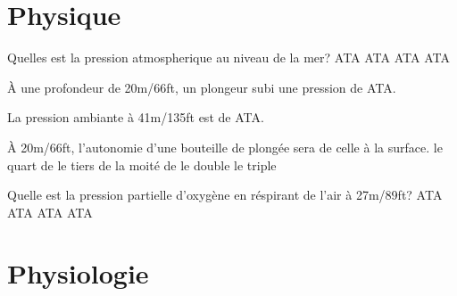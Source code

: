 \documentclass[english,12pt,a4paper]{article}
\begin{document}
\section{Physique}
	\begin{outline}
		\1 Quelles est la pression atmospherique au niveau de la mer?
			 ATA
			 ATA
			 ATA
			 ATA

		\1 À une profondeur de 20m/66ft, un plongeur subi une pression de \underline{\hspace{1.5cm}} ATA.

		\1 La pression ambiante à 41m/135ft est de \underline{\hspace{1.5cm}} ATA.

		\1 À 20m/66ft, l'autonomie d'une bouteille de plongée sera \underline{\hspace{1.5cm}} de celle à la surface.
			\2 le quart de
			\2 le tiers de
			\2 la moité de
			\2 le double
			\2 le triple

		\1 Quelle est la pression partielle d'oxygène en réspirant de l'air à 27m/89ft?
			 ATA
			 ATA
			 ATA
			 ATA
	\end{outline}
	\pagebreak

	\section{Physiologie}
\end{document}
